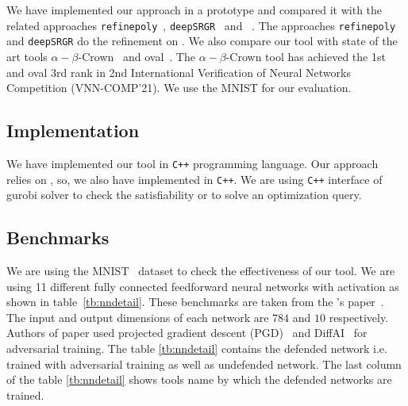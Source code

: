 We have implemented our approach in a prototype and compared it with the related 
approaches \texttt{refinepoly}~\cite{singh2019beyond}, \texttt{deepSRGR}~\cite{yang2021improving} and \deeppoly{}~\cite{singh2019abstract}. 
The approaches  \texttt{refinepoly} and \texttt{deepSRGR} do the refinement on \deeppoly{}. We also compare 
our tool with state of the art tools $\alpha - \beta$-Crown~\cite{alphabetacrown} and oval~\cite{ovaltool}. 
The $\alpha - \beta$-Crown tool has achieved the 1st and oval 3rd rank in
2nd International Verification of Neural Networks Competition (VNN-COMP'21). 
We use the MNIST \cite{deng2012mnist} for our evaluation.    
\subsection{Implementation}
We have implemented our tool in \texttt{C++} programming language. Our approach relies on \deeppoly{}, so, 
we also have implemented \deeppoly{} in \texttt{C++}. We are using \texttt{C++} interface of gurobi solver 
to check the satisfiability or to solve an optimization query. 

\subsection{Benchmarks}
We are using the MNIST~\cite{deng2012mnist} dataset to check the effectiveness of our tool. 
We are using 11 different fully connected feedforward neural networks with \relu{} activation as shown in table~\ref{tb:nndetail}.
These benchmarks are taken from the \deeppoly{}'s paper~\cite{singh2019abstract}. 
The input and output dimensions of each network are $784$ and $10$ respectively. 
Authors of \deeppoly{} paper used projected gradient descent (PGD)~\cite{dong2018boosting}
and DiffAI~\cite{mirman2018differentiable} for adversarial training. The table \ref{tb:nndetail} contains the defended network i.e.
trained with adversarial training as well as undefended network. The last column of the table \ref{tb:nndetail}
shows tools name by which the defended networks are trained.  

